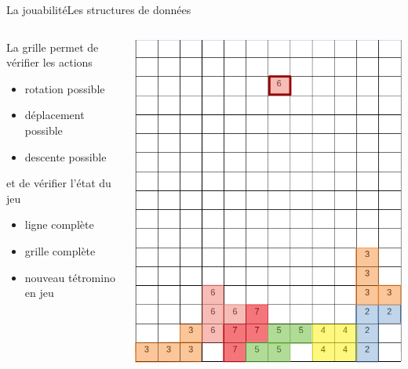 \documentclass[french]{beamer}
\begin{document}
		
			\begin{frame}{La jouabilité}{Les structures de données}
				\begin{columns}
					\begin{column}{0.6\textwidth}
						\begin{block}{La grille permet de vérifier les actions}
							\begin{itemize}
								\item rotation possible
								\item déplacement possible
								\item descente possible
							\end{itemize}
						\end{block}

						\begin{block}{et de vérifier l'état du jeu}
							\begin{itemize}
								\item ligne complète
								\item grille complète
								\item nouveau tétromino en jeu
							\end{itemize}
						\end{block}
					\end{column}
					\begin{column}{0.3\textwidth}
						\begin{center}
							\includegraphics[scale=0.2]{img/gridNB.png}
						\end{center}
					\end{column}
				\end{columns}
			\end{frame}
\end{document}
